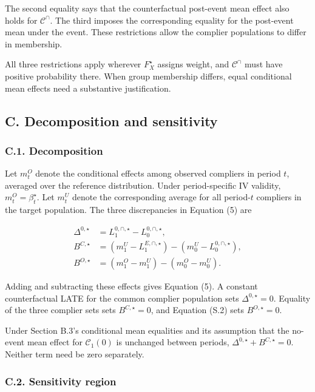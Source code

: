 \documentclass[
  11pt,
]{article}
\begin{document}
The second equality says that the counterfactual post-event mean effect
also holds for \(\mathcal C^\cap\). The third imposes the corresponding
equality for the post-event mean under the event. These restrictions
allow the complier populations to differ in membership.

All three restrictions apply wherever \(F_X^\star\) assigns weight, and
\(\mathcal C^\cap\) must have positive probability there. When group
membership differs, equal conditional mean effects need a substantive
justification.

\hypertarget{c.-decomposition-and-sensitivity}{%
\subsection{C. Decomposition and
sensitivity}\label{c.-decomposition-and-sensitivity}}

\hypertarget{c.1.-decomposition}{%
\subsubsection{C.1. Decomposition}\label{c.1.-decomposition}}

Let \(m_t^O\) denote the conditional effects among observed compliers in
period \(t\), averaged over the reference distribution. Under
period-specific IV validity, \(m_t^O=\beta_t^\star\). Let \(m_t^U\)
denote the corresponding average for all period-\(t\) compliers in the
target population. The three discrepancies in Equation (5) are

\[
\begin{aligned}
\Delta^{0,\star}
&=L_1^{0,\cap,\star}-L_0^{0,\cap,\star},\\
B^{C,\star}
&=(m_1^U-L_1^{E,\cap,\star})-(m_0^U-L_0^{0,\cap,\star}),\\
B^{O,\star}
&=(m_1^O-m_1^U)-(m_0^O-m_0^U).
\end{aligned}
\tag{S.8}
\]

Adding and subtracting these effects gives Equation (5). A constant
counterfactual LATE for the common complier population sets
\(\Delta^{0,\star}=0\). Equality of the three complier sets sets
\(B^{C,\star}=0\), and Equation (S.2) sets \(B^{O,\star}=0\).

Under Section B.3's conditional mean equalities and its assumption that
the no-event mean effect for \(\mathcal C_1(0)\) is unchanged between
periods, \(\Delta^{0,\star}+B^{C,\star}=0\). Neither term need be zero
separately.

\hypertarget{c.2.-sensitivity-region}{%
\subsubsection{C.2. Sensitivity region}\label{c.2.-sensitivity-region}}
\end{document}
